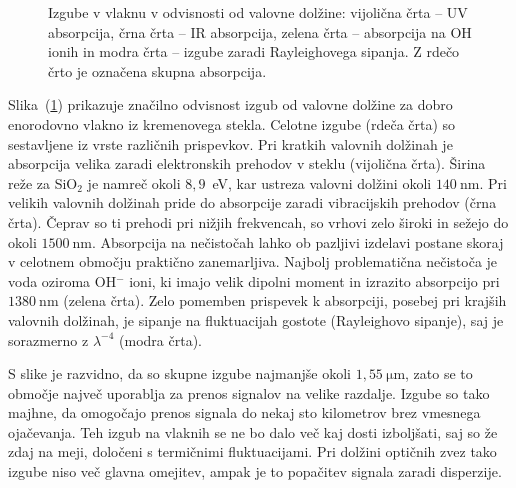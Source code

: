 \begin{figure}[h]
\centering
\def\svgwidth{90truemm} 
 
\caption{Izgube v vlaknu v odvisnosti od valovne dolžine: vijolična črta -- UV absorpcija, 
črna črta -- IR absorpcija, zelena črta -- absorpcija na OH ionih in modra črta --
izgube zaradi Rayleighovega sipanja. Z rdečo črto je označena skupna absorpcija.}
\label{FibAbs}
\end{figure}
Slika~(\ref{FibAbs}) prikazuje značilno odvisnost izgub od valovne dolžine 
za dobro enorodovno vlakno iz kremenovega stekla. 
Celotne izgube (rdeča črta)
so sestavljene iz vrste različnih prispevkov. 
Pri kratkih valovnih dolžinah je absorpcija velika zaradi elektronskih prehodov
v steklu (vijolična črta). 
Širina reže za SiO$_2$ je namreč okoli $8,9$~eV, 
kar ustreza valovni dolžini
okoli $140~\si{\nano\meter}$. Pri velikih valovnih dolžinah pride do absorpcije zaradi
vibracijskih prehodov (črna črta). Čeprav so ti prehodi pri nižjih frekvencah, 
so vrhovi zelo široki in sežejo do okoli $1500~\si{\nano\meter}$. 
Absorpcija na nečistočah lahko ob pazljivi izdelavi postane skoraj v celotnem 
območju praktično zanemarljiva. 
Najbolj problematična nečistoča je voda oziroma OH$^{-}$ ioni, ki imajo velik dipolni
moment in izrazito absorpcijo pri $1380~\si{\nano\meter}$ (zelena črta). Zelo pomemben prispevek k 
absorpciji, posebej pri krajših valovnih dolžinah, je sipanje na fluktuacijah 
gostote (Rayleighovo sipanje), 
saj je sorazmerno z $\lambda^{-4}$ (modra črta). 

S slike je razvidno, da so skupne izgube najmanjše
okoli $1,55~\si{\micro\meter}$, zato se to območje največ uporablja za prenos signalov
na velike razdalje. Izgube so tako majhne, da omogočajo prenos signala 
do nekaj sto kilometrov brez vmesnega ojačevanja. Teh izgub na vlaknih se  
ne bo dalo več kaj dosti izboljšati, saj so že zdaj na meji,
določeni s termičnimi fluktuacijami. Pri dolžini optičnih zvez tako izgube niso več glavna
omejitev, ampak je to popačitev signala zaradi disperzije.

